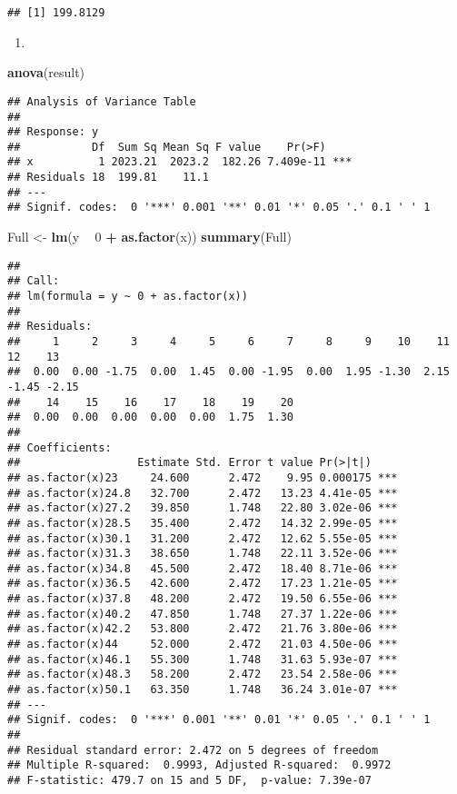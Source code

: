 \documentclass[
]{article}
\newenvironment{Shaded}{\begin{snugshade}}{\end{snugshade}}
\newcommand{\DecValTok}[1]{\textcolor[rgb]{0.00,0.00,0.81}{#1}}
\newcommand{\KeywordTok}[1]{\textcolor[rgb]{0.13,0.29,0.53}{\textbf{#1}}}
\newcommand{\NormalTok}[1]{#1}
\newcommand{\OperatorTok}[1]{\textcolor[rgb]{0.81,0.36,0.00}{\textbf{#1}}}
\newcommand{\StringTok}[1]{\textcolor[rgb]{0.31,0.60,0.02}{#1}}
\begin{document}
\begin{verbatim}
## [1] 199.8129
\end{verbatim}

\begin{enumerate}
\def\labelenumi{(\roman{enumi})}
\item
\end{enumerate}

\begin{Shaded}
\begin{Highlighting}[]
\KeywordTok{anova}\NormalTok{(result)}
\end{Highlighting}
\end{Shaded}

\begin{verbatim}
## Analysis of Variance Table
## 
## Response: y
##           Df  Sum Sq Mean Sq F value    Pr(>F)    
## x          1 2023.21  2023.2  182.26 7.409e-11 ***
## Residuals 18  199.81    11.1                      
## ---
## Signif. codes:  0 '***' 0.001 '**' 0.01 '*' 0.05 '.' 0.1 ' ' 1
\end{verbatim}

\begin{Shaded}
\begin{Highlighting}[]
\NormalTok{Full <-}\StringTok{ }\KeywordTok{lm}\NormalTok{(y }\OperatorTok{~}\StringTok{ }\DecValTok{0} \OperatorTok{+}\StringTok{ }\KeywordTok{as.factor}\NormalTok{(x))}
\KeywordTok{summary}\NormalTok{(Full)}
\end{Highlighting}
\end{Shaded}

\begin{verbatim}
## 
## Call:
## lm(formula = y ~ 0 + as.factor(x))
## 
## Residuals:
##     1     2     3     4     5     6     7     8     9    10    11    12    13 
##  0.00  0.00 -1.75  0.00  1.45  0.00 -1.95  0.00  1.95 -1.30  2.15 -1.45 -2.15 
##    14    15    16    17    18    19    20 
##  0.00  0.00  0.00  0.00  0.00  1.75  1.30 
## 
## Coefficients:
##                  Estimate Std. Error t value Pr(>|t|)    
## as.factor(x)23     24.600      2.472    9.95 0.000175 ***
## as.factor(x)24.8   32.700      2.472   13.23 4.41e-05 ***
## as.factor(x)27.2   39.850      1.748   22.80 3.02e-06 ***
## as.factor(x)28.5   35.400      2.472   14.32 2.99e-05 ***
## as.factor(x)30.1   31.200      2.472   12.62 5.55e-05 ***
## as.factor(x)31.3   38.650      1.748   22.11 3.52e-06 ***
## as.factor(x)34.8   45.500      2.472   18.40 8.71e-06 ***
## as.factor(x)36.5   42.600      2.472   17.23 1.21e-05 ***
## as.factor(x)37.8   48.200      2.472   19.50 6.55e-06 ***
## as.factor(x)40.2   47.850      1.748   27.37 1.22e-06 ***
## as.factor(x)42.2   53.800      2.472   21.76 3.80e-06 ***
## as.factor(x)44     52.000      2.472   21.03 4.50e-06 ***
## as.factor(x)46.1   55.300      1.748   31.63 5.93e-07 ***
## as.factor(x)48.3   58.200      2.472   23.54 2.58e-06 ***
## as.factor(x)50.1   63.350      1.748   36.24 3.01e-07 ***
## ---
## Signif. codes:  0 '***' 0.001 '**' 0.01 '*' 0.05 '.' 0.1 ' ' 1
## 
## Residual standard error: 2.472 on 5 degrees of freedom
## Multiple R-squared:  0.9993, Adjusted R-squared:  0.9972 
## F-statistic: 479.7 on 15 and 5 DF,  p-value: 7.39e-07
\end{verbatim}
\end{document}
